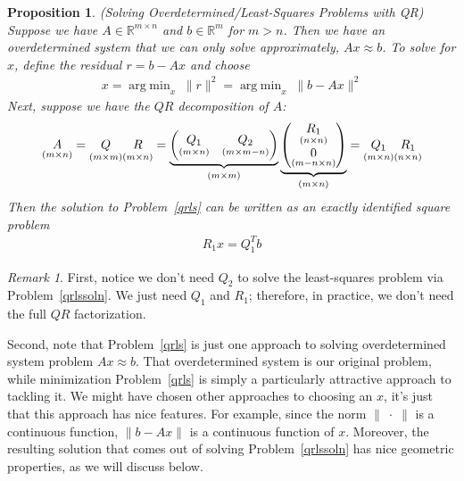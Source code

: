 \documentclass[12pt]{article}
\numberwithin{equation}{section} %
\theoremstyle{plain}
\newtheorem{prop}[thm]{Proposition}
\theoremstyle{definition}
\theoremstyle{remark}
\newtheorem*{rmk}{Remark}
\newcommand{\Rm}{\mathbb{R}^m}
\newcommand{\Rmn}{\mathbb{R}^{m\times n}}
\DeclareMathOperator*{\argmin}{arg\;min}
\begin{document}
\clearpage
\begin{prop}
\emph{(Solving Overdetermined/Least-Squares Problems with QR)}
Suppose we have $A\in\Rmn$ and $b\in\Rm$ for $m>n$.
Then we have an overdetermined system that we can only solve
approximately, $Ax\approx b$. To solve for $x$,
define the residual $r=b-Ax$ and choose
\begin{align}
  x = \argmin_x \;\lVert r\rVert^2 =
  \argmin_x \;\lVert b-Ax\rVert^2
  \label{qrls}
\end{align}
Next, suppose we have the $QR$ decomposition of $A$:
\begin{align*}
  \underset{(m\times n)}{A}
  =
  \underset{(m\times m)}{Q}
  \underset{(m\times n)}{R\vphantom{Q}}
  =
  \underbrace{%
    \begin{pmatrix}
      \underset{(m\times n)}{Q_1}
      & \underset{(m\times m-n)}{Q_2}
    \end{pmatrix}
  }_{(m\times m)}
  \underbrace{%
    \begin{pmatrix}
      \underset{(n\times n)}{R_1}
      \\
      \underset{(m-n\times n)}{0}
    \end{pmatrix}
  }_{(m\times n)}
  =
  \underset{(m\times n)}{Q_1}
  \underset{(n\times n)}{R_1\vphantom{Q_1}}
\end{align*}
Then the solution to Problem~\ref{qrls} can be written as an exactly
identified square problem
\begin{align}
  R_1 x = Q_1^T b
  \label{qrlssoln}
\end{align}
\end{prop}
\begin{rmk}
First, notice we don't need $Q_2$ to solve the least-squares problem via
Problem~\ref{qrlssoln}. We just need $Q_1$ and $R_1$; therefore, in
practice, we don't need the full $QR$ factorization.

Second, note that Problem~\ref{qrls} is just one approach to solving
overdetermined system problem $Ax\approx b$. That overdetermined system
is our original problem, while minimization Problem~\ref{qrls} is simply
a particularly attractive approach to tackling it. We might have chosen
other approaches to choosing an $x$, it's just that this approach has
nice features. For example, since the norm $\lVert\;\cdot\;\rVert$ is a
continuous function, $\lVert b-Ax\lVert$ is a continuous function of
$x$. Moreover, the resulting solution that comes out of solving
Problem~\ref{qrlssoln} has nice geometric properties, as we will discuss
below.
\end{rmk}
\end{document}
